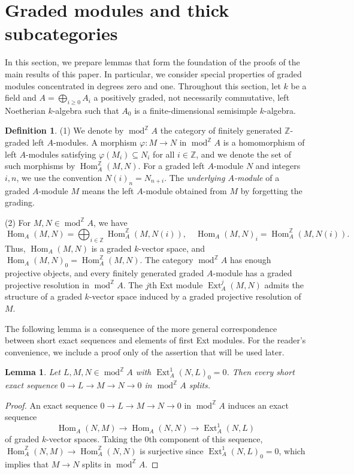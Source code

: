 \documentclass{amsart}
\newtheorem{lem}[thm]{Lemma}
\theoremstyle{definition}
\newtheorem{dfn}[thm]{Definition}
\theoremstyle{remark}
\numberwithin{equation}{thm}
\def\Ext{\operatorname{Ext}}
\def\gHom{\operatorname{Hom}^{\mathbb{Z}}}
\def\gmod{\operatorname{mod}^{\mathbb{Z}}\!}
\def\Hom{\operatorname{Hom}}
\def\ge{\geqslant}
\def\Z{\mathbb{Z}}
\begin{document}
\section{Graded modules and thick subcategories}

In this section, we prepare lemmas that form the foundation of the proofs of the main results of this paper. In particular, we consider special properties of graded modules concentrated in degrees zero and one. Throughout this section, let $k$ be a field and $A=\bigoplus_{i\ge0}A_i$ a positively graded, not necessarily commutative, left Noetherian $k$-algebra such that $A_0$ is a finite-dimensional semisimple $k$-algebra. %

\begin{dfn}
(1) We denote by $\gmod A$ the category of finitely generated $\Z$-graded left $A$-modules.
A morphism $\varphi:M\to N$ in $\gmod A$ is a homomorphism of left $A$-modules satisfying $\varphi(M_i)\subseteq N_i$ for all $i\in\Z$, and we denote the set of such morphisms by $\gHom_A(M,N)$.
For a graded left $A$-module $N$ and integers $i,n$, we use the convention $N(i)_n=N_{n+i}$.
The \textit{underlying $A$-module} of a graded $A$-module $M$ means the left $A$-module obtained from $M$ by forgetting the grading.

(2) For $M,N\in\gmod A$, we have 
$$
\Hom_A(M,N)=\bigoplus_{i\in\Z}\gHom_A(M,N(i)), \quad
\Hom_A(M,N)_i=\gHom_A(M,N(i)).
$$
Thus, $\Hom_A(M,N)$ is a graded $k$-vector space, and $\Hom_A(M,N)_0=\gHom_A(M,N)$.
The category $\gmod A$ has enough projective objects, and every finitely generated graded $A$-module has a graded projective resolution in $\gmod A$.
The $j$th Ext module $\Ext_A^j(M,N)$ admits the structure of a graded $k$-vector space induced by a graded projective resolution of $M$.
\end{dfn}

The following lemma is a consequence of the more general correspondence between short exact sequences and elements of first Ext modules. For the reader's convenience, we include a proof only of the assertion that will be used later.

\begin{lem}\label{graded Ext1}
Let $L,M,N\in\gmod A$ with $\Ext_A^1(N,L)_0=0$. Then every short exact sequence $0\to L\to M\to N\to0$ in $\gmod A$ splits.
\end{lem}

\begin{proof}
An exact sequence $0\to L\to M\to N\to0$ in $\gmod A$ induces an exact sequence 
$$
\Hom_A(N,M)\to \Hom_A(N,N)\to\Ext_A^1(N,L)
$$
of graded $k$-vector spaces. Taking the $0$th component of this sequence, $\gHom_A(N,M)\to \gHom_A(N,N)$ is surjective since $\Ext_A^1(N,L)_0=0$, which implies that $M\to N$ splits in $\gmod A$.
\end{proof}
\end{document}
